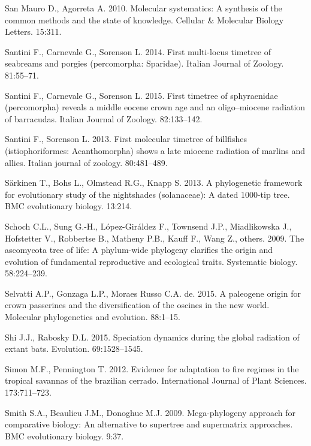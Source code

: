 \documentclass[]{article}
\begin{document}
\leavevmode\hypertarget{ref-san2010molecular}{}%
San Mauro D., Agorreta A. 2010. Molecular systematics: A synthesis of the common methods and the state of knowledge. Cellular \& Molecular Biology Letters. 15:311.

\leavevmode\hypertarget{ref-santini2014first}{}%
Santini F., Carnevale G., Sorenson L. 2014. First multi-locus timetree of seabreams and porgies (percomorpha: Sparidae). Italian Journal of Zoology. 81:55--71.

\leavevmode\hypertarget{ref-santini2015first}{}%
Santini F., Carnevale G., Sorenson L. 2015. First timetree of sphyraenidae (percomorpha) reveals a middle eocene crown age and an oligo--miocene radiation of barracudas. Italian Journal of Zoology. 82:133--142.

\leavevmode\hypertarget{ref-santini2013first}{}%
Santini F., Sorenson L. 2013. First molecular timetree of billfishes (istiophoriformes: Acanthomorpha) shows a late miocene radiation of marlins and allies. Italian journal of zoology. 80:481--489.

\leavevmode\hypertarget{ref-sarkinen2013solanaceae}{}%
Särkinen T., Bohs L., Olmstead R.G., Knapp S. 2013. A phylogenetic framework for evolutionary study of the nightshades (solanaceae): A dated 1000-tip tree. BMC evolutionary biology. 13:214.

\leavevmode\hypertarget{ref-schoch2009ascomycota}{}%
Schoch C.L., Sung G.-H., López-Giráldez F., Townsend J.P., Miadlikowska J., Hofstetter V., Robbertse B., Matheny P.B., Kauff F., Wang Z., others. 2009. The ascomycota tree of life: A phylum-wide phylogeny clarifies the origin and evolution of fundamental reproductive and ecological traits. Systematic biology. 58:224--239.

\leavevmode\hypertarget{ref-selvatti2015paleogene}{}%
Selvatti A.P., Gonzaga L.P., Moraes Russo C.A. de. 2015. A paleogene origin for crown passerines and the diversification of the oscines in the new world. Molecular phylogenetics and evolution. 88:1--15.

\leavevmode\hypertarget{ref-shi2015speciation}{}%
Shi J.J., Rabosky D.L. 2015. Speciation dynamics during the global radiation of extant bats. Evolution. 69:1528--1545.

\leavevmode\hypertarget{ref-simon2012cerrado}{}%
Simon M.F., Pennington T. 2012. Evidence for adaptation to fire regimes in the tropical savannas of the brazilian cerrado. International Journal of Plant Sciences. 173:711--723.

\leavevmode\hypertarget{ref-smith2009mega}{}%
Smith S.A., Beaulieu J.M., Donoghue M.J. 2009. Mega-phylogeny approach for comparative biology: An alternative to supertree and supermatrix approaches. BMC evolutionary biology. 9:37.
\end{document}
